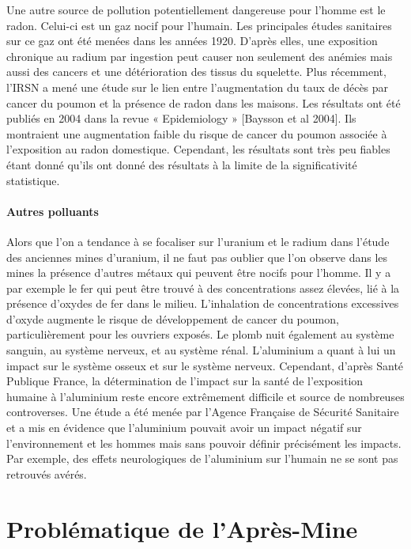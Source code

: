 \documentclass{article}
\begin{document}
Une autre source de pollution potentiellement dangereuse pour l’homme est le radon. Celui-ci est un gaz nocif pour l’humain. Les principales études sanitaires sur ce gaz ont été menées dans les années 1920. D’après elles, une exposition chronique au radium par ingestion peut causer non seulement des anémies mais aussi des cancers et une détérioration des tissus du squelette.
Plus récemment, l’IRSN a mené une étude sur le lien entre l’augmentation du taux de décès par cancer du poumon et la présence de radon dans les maisons. Les résultats ont été publiés en 2004 dans la revue « Epidemiology » [Baysson et al 2004]. Ils montraient une augmentation faible du risque de cancer du poumon associée à l’exposition au radon  domestique. Cependant, les résultats sont très peu fiables étant donné qu’ils ont donné des résultats à la limite de la significativité statistique.  

\paragraph{Autres polluants}

Alors que l’on a tendance à se focaliser sur l’uranium et le radium dans l’étude des anciennes mines d’uranium, il ne faut pas oublier que l’on observe dans les mines la présence d'autres métaux qui peuvent être nocifs pour l’homme. Il y a par exemple le fer qui peut être trouvé à des concentrations assez élevées, lié à la présence d'oxydes de fer dans le milieu.  L'inhalation de concentrations excessives d'oxyde augmente le risque de développement de cancer du poumon, particulièrement pour les ouvriers exposés. Le plomb nuit également au système sanguin, au système nerveux, et au système rénal.
L’aluminium a quant à lui un impact sur le système osseux et sur le système nerveux. Cependant, d’après Santé Publique France, la détermination de l'impact sur la santé de l'exposition humaine à l'aluminium reste encore extrêmement difficile et source de nombreuses controverses. Une étude a été menée par l’Agence Française de Sécurité Sanitaire et a mis en évidence que l’aluminium pouvait avoir un impact négatif sur l’environnement et les hommes mais sans pouvoir définir précisément les impacts.  Par exemple, des effets neurologiques de l’aluminium sur l’humain ne se sont pas retrouvés avérés.

\newpage
\section{Problématique de l’Après-Mine}
\end{document}
